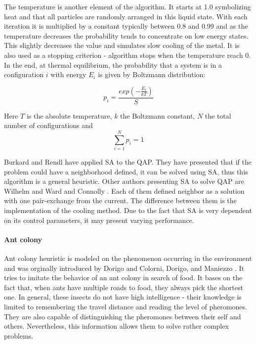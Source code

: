 The temperature is another element of the algorithm.
It starts at 1.0 symbolizing heat and that all particles are randomly arranged in this liquid state.
With each iteration it is multiplied by a constant typically between 0.8 and 0.99 and as the temperature decreases the probability tends to concentrate on low energy states.
This slightly decreases the value and simulates slow cooling of the metal.
It is also used as a stopping criterion - algorithm stops when the temperature reach 0.
In the end, at thermal equilibrium, the probability that a system is in a configuration $i$ with energy $E_i$ is given by Boltzmann distribution:

\begin{equation}
  p_i = \frac{exp(-\frac{E_i}{kT})}{S}
\end{equation}

Here $T$ is the absolute temperature, $k$ the Boltzmann constant, $N$ the total number of configurations and
\begin{equation}
  \sum_{i=1}^{N} p_i = 1
\end{equation}

Burkard and Rendl \cite{burkard1984thermodynamically} have applied SA to the QAP.
They have presented that if the problem could have a neighborhood defined, it can be solved using SA, thus this algorithm is a general heuristic.
Other authors presenting SA to solve QAP are Wilhelm and Ward \cite{wilhelm1987solving} and Connolly \cite{connolly1990improved}.
Each of them defined neighbor as a solution with one pair-exchange from the current.
The difference between them is the implementation of the cooling method.
Due to the fact that SA is very dependent on its control parameters, it may present varying performance.

\paragraph{Ant colony}

Ant colony heuristic is modeled on the phenomenon occurring in the environment and was orginally introduced by Dorigo \cite{dorigo1992optimization} and Colorni, Dorigo, and Maniezzo \cite{dorigo1996ant}.
It tries to imitate the behavior of an ant colony in search of food.
It bases on the fact that, when ants have multiple roads to food, they always pick the shortest one.
In general, these insects do not have high intelligence - their knowledge is limited to remembering the travel distance and reading the level of pheromones.
They are also capable of distinguishing the pheromones between their self and others.
Nevertheless, this information allows them to solve rather complex problems.

